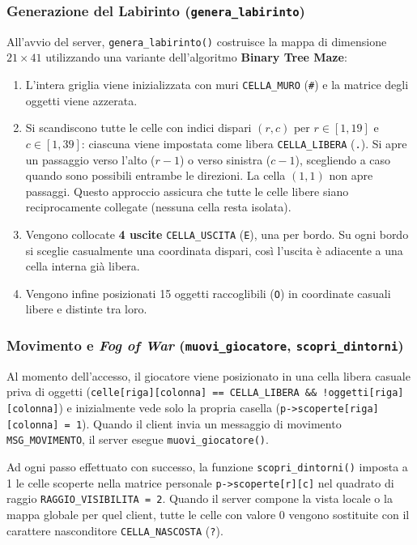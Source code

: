 \documentclass[11pt,a4paper]{article}
\begin{document}
\subsubsection{Generazione del Labirinto (\texttt{genera\_labirinto})}
All'avvio del server, \texttt{genera\_labirinto()} costruisce la mappa di dimensione $21 \times 41$ utilizzando una variante dell'algoritmo \textbf{Binary Tree Maze}:
\begin{enumerate}
    \item L'intera griglia viene inizializzata con muri \texttt{CELLA\_MURO} (\texttt{\#}) e la matrice degli oggetti viene azzerata.
    \item Si scandiscono tutte le celle con indici dispari $(r, c)$ per $r \in [1, 19]$ e $c \in [1, 39]$: ciascuna viene impostata come libera \texttt{CELLA\_LIBERA} (\texttt{.}). Si apre un passaggio verso l'alto ($r - 1$) o verso sinistra ($c - 1$), scegliendo a caso quando sono possibili entrambe le direzioni. La cella $(1, 1)$ non apre passaggi. Questo approccio assicura che tutte le celle libere siano reciprocamente collegate (nessuna cella resta isolata).
    \item Vengono collocate \textbf{4 uscite} \texttt{CELLA\_USCITA} (\texttt{E}), una per bordo. Su ogni bordo si sceglie casualmente una coordinata dispari, così l'uscita è adiacente a una cella interna già libera.
    \item Vengono infine posizionati 15 oggetti raccoglibili (\texttt{O}) in coordinate casuali libere e distinte tra loro.
\end{enumerate}

\subsubsection{Movimento e \textit{Fog of War} (\texttt{muovi\_giocatore}, \texttt{scopri\_dintorni})}
Al momento dell'accesso, il giocatore viene posizionato in una cella libera casuale priva di oggetti (\texttt{celle[riga][colonna] == CELLA\_LIBERA \&\& !oggetti[riga][colonna]}) e inizialmente vede solo la propria casella (\texttt{p->scoperte[riga][colonna] = 1}).
Quando il client invia un messaggio di movimento \texttt{MSG\_MOVIMENTO}, il server esegue \texttt{muovi\_giocatore()}.

Ad ogni passo effettuato con successo, la funzione \texttt{scopri\_dintorni()} imposta a 1 le celle scoperte nella matrice personale \texttt{p->scoperte[r][c]} nel quadrato di raggio \texttt{RAGGIO\_VISIBILITA = 2}. Quando il server compone la vista locale o la mappa globale per quel client, tutte le celle con valore 0 vengono sostituite con il carattere nasconditore \texttt{CELLA\_NASCOSTA} (\texttt{?}).
\end{document}
